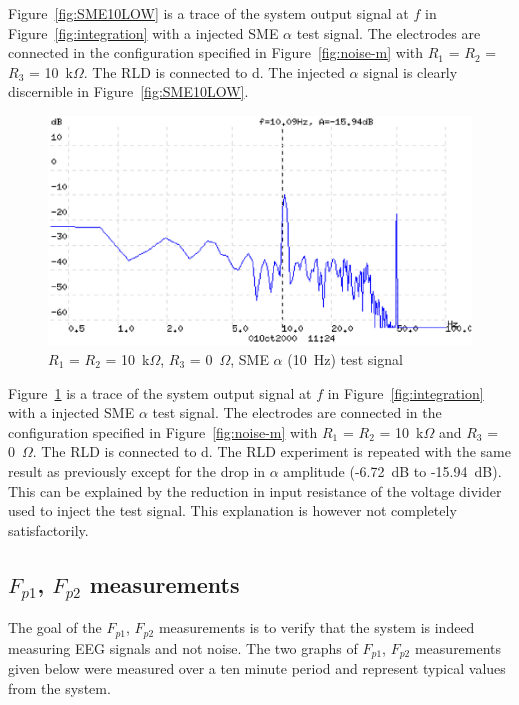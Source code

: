 Figure~\ref{fig:SME10LOW} is a trace of the system output signal at
$f$ in Figure~\ref{fig:integration} with a injected SME $\alpha$ test
signal. The electrodes are connected in the configuration specified in
Figure~\ref{fig:noise-m} with $R_1$ = $R_2$ = $R_3$ =
10~k$\Omega$. The RLD is connected to d. The injected $\alpha$ signal
is clearly discernible in Figure~\ref{fig:SME10LOW}. 


\begin{figure}[htbp]
\begin{center}
	\includegraphics[width=\textwidth]{SME10LOW2.ps} 
	\caption{$R_1$ = $R_2$ = 10~k$\Omega$, $R_3$ = 0~$\Omega$, 
	SME $\alpha$ (10~Hz) test signal}
    \label{fig:SME10LOW2}
\end{center}
\end{figure}

Figure~\ref{fig:SME10LOW2} is a trace of the system output signal at
$f$ in Figure~\ref{fig:integration} with a injected SME $\alpha$ test
signal. The electrodes are connected in the configuration specified in
Figure~\ref{fig:noise-m} with $R_1$ = $R_2$ = 10~k$\Omega$ and $R_3$ =
0~$\Omega$. The RLD is connected to d. The RLD experiment is repeated
with the same result as previously except for the drop in $\alpha$
amplitude (-6.72~dB to -15.94~dB). This can be explained by the
reduction in input resistance of the voltage divider used to inject
the test signal. This explanation is however not completely
satisfactorily.

\subsection{$F_{p1}$, $F_{p2}$ measurements}
The goal of the $F_{p1}$, $F_{p2}$ measurements is to verify that the
system is indeed measuring EEG signals and not noise. The two graphs
of $F_{p1}$, $F_{p2}$ measurements given below were measured over a
ten minute period and represent typical values from the system.

